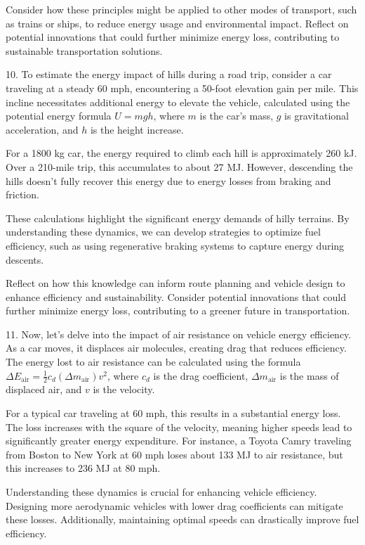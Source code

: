 \begin{tcolorbox}[size=title,opacityfill=0.05,breakable]
Consider how these principles might be applied to other modes of transport, such as trains or ships, to reduce energy usage and environmental impact. Reflect on potential innovations that could further minimize energy loss, contributing to sustainable transportation solutions.

10. To estimate the energy impact of hills during a road trip, consider a car traveling at a steady 60 mph, encountering a 50-foot elevation gain per mile. This incline necessitates additional energy to elevate the vehicle, calculated using the potential energy formula \( U = mgh \), where \( m \) is the car's mass, \( g \) is gravitational acceleration, and \( h \) is the height increase.

For a 1800 kg car, the energy required to climb each hill is approximately 260 kJ. Over a 210-mile trip, this accumulates to about 27 MJ. However, descending the hills doesn't fully recover this energy due to energy losses from braking and friction.

These calculations highlight the significant energy demands of hilly terrains. By understanding these dynamics, we can develop strategies to optimize fuel efficiency, such as using regenerative braking systems to capture energy during descents.

Reflect on how this knowledge can inform route planning and vehicle design to enhance efficiency and sustainability. Consider potential innovations that could further minimize energy loss, contributing to a greener future in transportation.


11. Now, let's delve into the impact of air resistance on vehicle energy efficiency. As a car moves, it displaces air molecules, creating drag that reduces efficiency. The energy lost to air resistance can be calculated using the formula \( \Delta E_{\text{air}} = \frac{1}{2} c_d (\Delta m_{\text{air}}) v^2 \), where \( c_d \) is the drag coefficient, \( \Delta m_{\text{air}} \) is the mass of displaced air, and \( v \) is the velocity.

For a typical car traveling at 60 mph, this results in a substantial energy loss. The loss increases with the square of the velocity, meaning higher speeds lead to significantly greater energy expenditure. For instance, a Toyota Camry traveling from Boston to New York at 60 mph loses about 133 MJ to air resistance, but this increases to 236 MJ at 80 mph.

Understanding these dynamics is crucial for enhancing vehicle efficiency. Designing more aerodynamic vehicles with lower drag coefficients can mitigate these losses. Additionally, maintaining optimal speeds can drastically improve fuel efficiency.


\end{tcolorbox}
